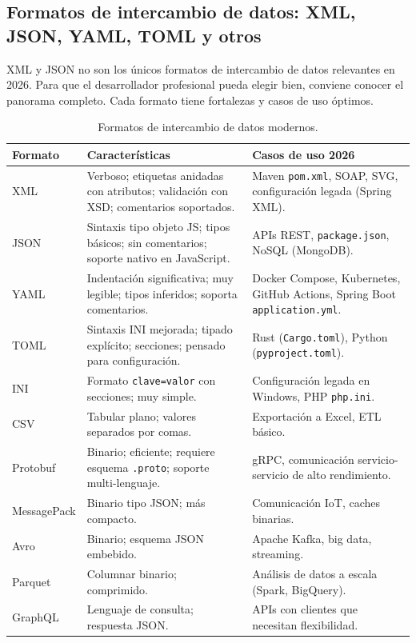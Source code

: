 \subsection{Formatos de intercambio de datos: XML, JSON, YAML, TOML y otros}

XML y JSON no son los únicos formatos de intercambio de datos
relevantes en 2026. Para que el desarrollador profesional pueda
elegir bien, conviene conocer el panorama completo. Cada formato
tiene fortalezas y casos de uso óptimos.

\begin{table}[htbp]
\centering
\caption{Formatos de intercambio de datos modernos.}
\label{tab:formatos-datos}
\footnotesize
\begin{tabularx}{\textwidth}{lXX}
\toprule
\textbf{Formato} & \textbf{Características} & \textbf{Casos de uso 2026}\\
\midrule
XML & Verboso; etiquetas anidadas con atributos; validación con XSD; comentarios soportados. & Maven \texttt{pom.xml}, SOAP, SVG, configuración legada (Spring XML).\\
JSON & Sintaxis tipo objeto JS; tipos básicos; sin comentarios; soporte nativo en JavaScript. & APIs REST, \texttt{package.json}, NoSQL (MongoDB).\\
YAML & Indentación significativa; muy legible; tipos inferidos; soporta comentarios. & Docker Compose, Kubernetes, GitHub Actions, Spring Boot \texttt{application.yml}.\\
TOML & Sintaxis INI mejorada; tipado explícito; secciones; pensado para configuración. & Rust (\texttt{Cargo.toml}), Python (\texttt{pyproject.toml}).\\
INI & Formato \texttt{clave=valor} con secciones; muy simple. & Configuración legada en Windows, PHP \texttt{php.ini}.\\
CSV & Tabular plano; valores separados por comas. & Exportación a Excel, ETL básico.\\
Protobuf & Binario; eficiente; requiere esquema \texttt{.proto}; soporte multi-lenguaje. & gRPC, comunicación servicio-servicio de alto rendimiento.\\
MessagePack & Binario tipo JSON; más compacto. & Comunicación IoT, caches binarias.\\
Avro & Binario; esquema JSON embebido. & Apache Kafka, big data, streaming.\\
Parquet & Columnar binario; comprimido. & Análisis de datos a escala (Spark, BigQuery).\\
GraphQL & Lenguaje de consulta; respuesta JSON. & APIs con clientes que necesitan flexibilidad.\\
\bottomrule
\end{tabularx}
\end{table}

